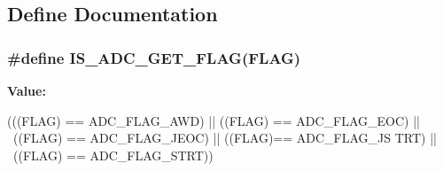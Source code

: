 \subsection{Define Documentation}
\hypertarget{group__ADC__flags__definition_ga597eb68dfef9dbe0928ed14a1aedc710}{
\subsubsection[{IS\_\-ADC\_\-GET\_\-FLAG}]{\setlength{\rightskip}{0pt plus 5cm}\#define IS\_\-ADC\_\-GET\_\-FLAG(FLAG)}}
\label{group__ADC__flags__definition_ga597eb68dfef9dbe0928ed14a1aedc710}
{\bfseries Value:}
\begin{DoxyCode}
(((FLAG) == ADC_FLAG_AWD) || ((FLAG) == ADC_FLAG_EOC) || \
                               ((FLAG) == ADC_FLAG_JEOC) || ((FLAG)== ADC_FLAG_JS
      TRT) || \
                               ((FLAG) == ADC_FLAG_STRT))
\end{DoxyCode}

